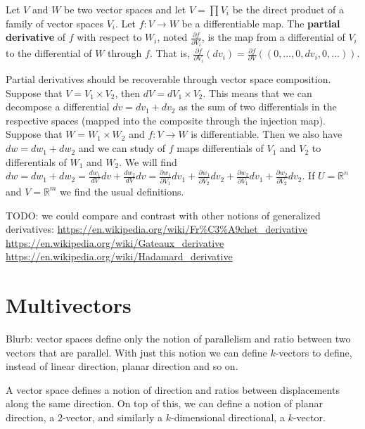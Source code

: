 \documentclass[11pt,letterpaper,fleqn]{memoir}
\begin{document}
\begin{defn}
	Let $V$ and $W$ be two vector spaces and let $V=\prod V_i$ be the direct product of a family of vector spaces $V_i$. Let $f: V \to W$ be a differentiable map. The \textbf{partial derivative} of $f$ with respect to $W_i$, noted $\frac{\partial f}{\partial V_i}$, is the map from a differential of $V_i$ to the differential of $W$ through $f$. That is, $\frac{\partial f}{\partial V_i} (dv_i) = \frac{\partial f}{\partial V} \left( (0, ..., 0, dv_i, 0, ...) \right)$.
\end{defn}

\begin{remark}
	Partial derivatives should be recoverable through vector space composition. Suppose that $V = V_1 \times V_2$, then $dV = dV_1 \times V_2$. This means that we can decompose a differential $dv= dv_1 + dv_2$ as the sum of two differentials in the respective spaces (mapped into the composite through the injection map). Suppose that $W = W_1 \times W_2$ and $f : V \to W$ is differentiable. Then we also have $dw= dw_1 + dw_2$ and we can study of $f$ maps differentials of $V_1$ and $V_2$ to differentials of $W_1$ and $W_2$. We will find $dw = dw_1 + dw_2 = \frac{dw_1}{dV} dv + \frac{dw_2}{dV} dv = \frac{\partial w_1}{\partial V_1} dv_1 + \frac{\partial w_1}{\partial V_2} dv_2 + \frac{\partial w_2}{\partial V_1} dv_1 + \frac{\partial w_2}{\partial V_2} dv_2$. If $U = \mathbb{R}^n$ and $V = \mathbb{R}^m$ we find the usual definitions.
\end{remark}

\begin{remark}
	TODO: we could compare and contrast with other notions of generalized derivatives: \url{https://en.wikipedia.org/wiki/Fr%C3%A9chet_derivative} \url{https://en.wikipedia.org/wiki/Gateaux_derivative} \url{https://en.wikipedia.org/wiki/Hadamard_derivative}
\end{remark}


\section{Multivectors}

Blurb: vector spaces define only the notion of parallelism and ratio between two vectors that are parallel. With just this notion we can define $k$-vectors to define, instead of linear direction, planar direction and so on.

A vector space defines a notion of direction and ratios between displacements along the same direction. On top of this, we can define a notion of planar direction, a $2$-vector, and similarly a $k$-dimensional directional, a $k$-vector.
\end{document}
